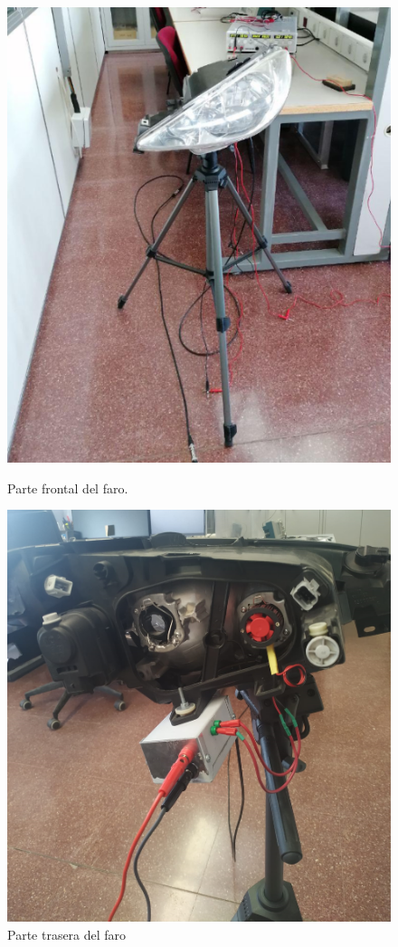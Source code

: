 \begin{figure}[ht]
	\centering
	  \begin{minipage}{7cm}
		\centering
		\includegraphics[scale=0.40]{./figuras/faro2.png}
		\caption{Parte frontal del faro.}
		\label{faro}
	  \end{minipage}%
	  \hspace{5mm}
	  \begin{minipage}{7cm}
		\centering
		\includegraphics[scale=0.139]{./figuras/faro.png}
		\caption{Parte trasera del faro}
		\label{faro2}
	  \end{minipage}
\end{figure}

